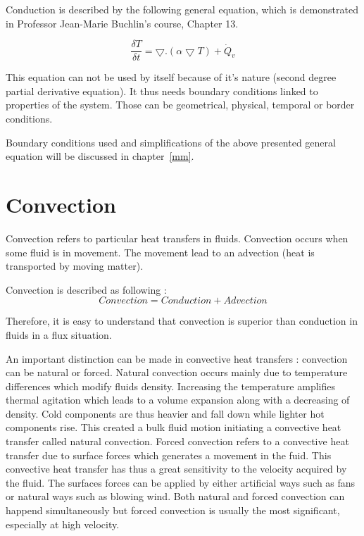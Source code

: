 \documentclass{report}
\begin{document}
	Conduction is described by the following general equation, which is demonstrated in Professor Jean-Marie Buchlin's course\cite{Buchlin}, Chapter 13.
	
	\begin{equation}
		\frac{\delta T}{\delta t} = \bigtriangledown . (\alpha \bigtriangledown T)+ \dot{Q}_v
	\end{equation}
	
	This equation can not be used by itself because of it's nature (second degree partial derivative equation). It thus needs boundary conditions linked to properties of the system. Those can be geometrical, physical, temporal or border conditions.
	
	Boundary conditions used and simplifications of the above presented general equation will be discussed in chapter~\ref{mm}.
	
	\section{Convection}\label{cv}
	
	Convection refers to particular heat transfers in fluids. Convection occurs when some fluid is in movement. The movement lead to an advection (heat is transported by moving matter).
	
	Convection is described as following :
	\begin{equation}
		Convection = Conduction + Advection
	\end{equation}
	
	Therefore, it is easy to understand that convection is superior than conduction in fluids in a flux situation. 
	
	An important distinction can be made in convective heat transfers : convection can be natural or forced.
	Natural convection occurs mainly due to temperature differences which modify fluids density. Increasing the temperature amplifies thermal agitation which leads to a volume expansion along with a decreasing of density. Cold components are thus heavier and fall down while lighter hot components rise. This created a bulk fluid motion initiating a convective heat transfer called natural convection.
	Forced convection refers to a convective heat transfer due to surface forces which generates a movement in the fuid. This convective heat transfer has thus a great sensitivity to the velocity acquired by the fluid. The surfaces forces can be applied by either artificial ways such as fans or natural ways such as blowing wind. 
	Both natural and forced convection can happend simultaneously but forced convection is usually the most significant, especially at high velocity.
	
\end{document}
